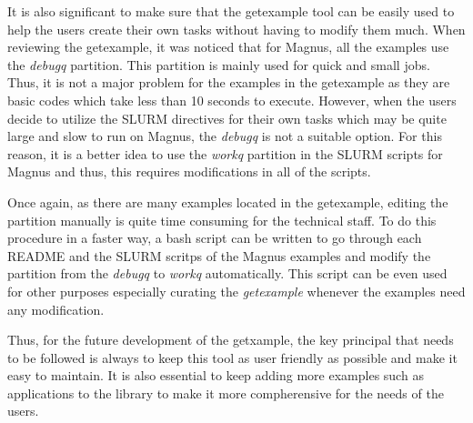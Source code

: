 It is also significant to make sure that the getexample tool can be easily used to help the users create their own tasks without having to modify them
much. When reviewing the getexample, it was noticed that for Magnus, all the examples use the \emph{debugq} partition. This partition is mainly used
for quick and small jobs. Thus, it is not a major problem for the examples in the getexample as they are basic codes which take less than 10 seconds 
to execute. However, when the users decide to utilize the SLURM directives for their own tasks which may be quite large and slow to run on Magnus, the 
\emph{debugq} is not a suitable option. For this reason, it is a better idea to use the \emph{workq} partition in the SLURM scripts for Magnus and thus,
this requires modifications in all of the scripts.

Once again, as there are many examples located in the getexample, editing the partition manually is quite time consuming for the technical staff. To do 
this procedure in a faster way, a bash script can be written to go through each README and the SLURM scritps of the Magnus examples and modify the 
partition from the \emph{debugq} to \emph{workq} automatically. This script can be even used for other purposes especially curating the \emph{getexample} 
whenever the examples need any modification.   

Thus, for the future development of the getxample, the key principal that needs to be followed is always to keep this tool as user friendly as possible 
and make it easy to maintain. It is also essential to keep adding more examples such as applications to the library to make it more compherensive for 
the needs of the users.  
